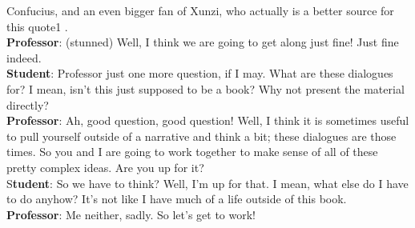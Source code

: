 Confucius, and an even bigger fan of Xunzi, who actually is a better source for
this quote1 . \\
\noindent\textbf{Professor}: (stunned) Well, I think we are going to get along
just fine! Just fine indeed. \\
\noindent\textbf{Student}: Professor  just one more question, if I may. What are
these dialogues for? I mean, isn’t this just supposed to be a book? Why not
present the material directly? \\
\noindent\textbf{Professor}: Ah, good question, good question! Well, I think it
is sometimes useful to pull yourself outside of a narrative and think a bit;
these dialogues are those times. So you and I are going to work together to make
sense of all of these pretty complex ideas. Are you up for it? \\
S\noindent\textbf{tudent}: So we have to think? Well, I’m up for that. I mean,
what else do I have to do anyhow? It’s not like I have much of a life outside
of this book. \\
\noindent\textbf{Professor}: Me neither, sadly. So let’s get to work! 